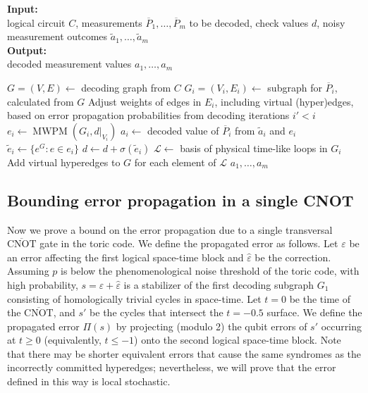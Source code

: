 \documentclass[prx,twocolumn,secnumarabic,balancelastpage,amsmath,amssymb,longbibliography]{revtex4-2}
\newcommand{\lop}[1]{\overline{#1}}
\newcommand{\lcnot}{\overline{\text{CNOT}}}
\begin{document}
\begin{algorithm}[H]
\caption{Decoding with software commitments}
\label{alg:iterativedecoding}
\textbf{Input:}\\
logical circuit $C$, measurements $\lop P_1, \dots, \lop P_m$ to be decoded, check values $d$, noisy measurement outcomes $\tilde a_1, \dots, \tilde a_m$\\
\textbf{Output:} \\decoded measurement values $a_1, \dots, a_m$
\begin{algorithmic}[1]
    \State $G = (V, E) \gets $ decoding graph from $C$
        \State $G_i = (V_i, E_i) \gets $ subgraph for $\lop P_i$, calculated from $G$
        \State Adjust weights of edges in $E_i$, including virtual (hyper)edges, based on error propagation probabilities from decoding iterations $i' < i$ 
        \State $e_i \gets \operatorname{MWPM}(G_i, \left. d \right|_{V_i})$ 
        \State $a_i \gets $ decoded value of $\lop P_i$ from $\tilde a_i$ and $e_i$
        \State $\tilde e_i \gets \{e^G: e\in e_i\}$
        \State $d \gets d + \sigma(\tilde e_i)$ 
        \State $\mathcal L \gets $ basis of physical time-like loops in $G_i$
        \State Add virtual hyperedges to $G$ for each element of $\mathcal L$
    \EndFor
    \State \Return $a_1, \dots, a_m$
\end{algorithmic}
\end{algorithm}

\subsection{Bounding error propagation in a single CNOT \label{app:error_prop}}
%
Now we prove a bound on the error propagation due to a single transversal $\lcnot$ gate in the toric code. 
%
We define the propagated error as follows. 
%
Let $\varepsilon$ be an error affecting the first logical space-time block and $\hat\varepsilon$ be the correction. 
%
Assuming $p$ is below the phenomenological noise threshold of the toric code, with high probability, $s=\varepsilon+\hat\varepsilon$ is a stabilizer of the first decoding subgraph $G_1$ consisting of homologically trivial cycles in space-time. 
%
Let $t=0$ be the time of the $\lcnot$, and $s'$ be the cycles that intersect the $t=-0.5$ surface. 
%
We define the propagated error $\Pi(s)$ by projecting (modulo 2) the qubit errors of $s'$ occurring at $t\ge 0$ (equivalently, $t\le -1$) onto the second logical space-time block. 
%
Note that there may be shorter equivalent errors that cause the same syndromes as the incorrectly committed hyperedges; nevertheless, we will prove that the error defined in this way is local stochastic.
\end{document}
